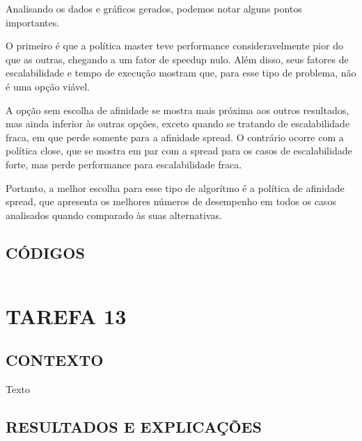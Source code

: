 \documentclass[12pt, openright, oneside, a4paper, brazil]{article}
\newcommand{\subtUm}{CONTEXTO}
\newcommand{\subtDois}{RESULTADOS E EXPLICAÇÕES}
\newcommand{\subtTres}{CÓDIGOS}
\begin{document}
		\par{
				Analisando os dados e gráficos gerados, podemos notar alguns pontos importantes. 
			
			O primeiro é que a política master teve performance consideravelmente pior do que as outras, chegando a um fator de speedup nulo. Além disso, seus fatores de escalabilidade e tempo de execução mostram que, para esse tipo de problema, não é uma opção viável.
			
			A opção sem escolha de afinidade se mostra mais próxima aos outros resultados, mas ainda inferior às outras opções, exceto quando se tratando de escalabilidade fraca, em que  perde somente para a afinidade spread. O contrário ocorre com a política close, que se mostra em par com a spread para os casos de escalabilidade forte, mas perde performance para escalabilidade fraca.
			
			Portanto, a melhor escolha para esse tipo de algorítmo é a política de afinidade spread, que apresenta os melhores números de desempenho em todos os casos analisados quando comparado às suas alternativas.
			}
		\subsection{\subtTres}
		\begin{lstlisting}[language=c]
		\end{lstlisting}
		
	\newpage
		\onehalfspacing
		\section{TAREFA 13}
		\subsection{\subtUm}
		\par{Texto}
		\subsection{\subtDois}
		
\end{document}
